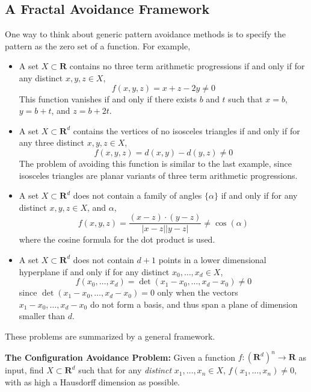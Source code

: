 \documentclass{article}
\theoremstyle{plain}
\theoremstyle{plain}
\begin{document}
\begin{multicols}{2}

\section{A Fractal Avoidance Framework}

One way to think about generic pattern avoidance methods is to specify the pattern as the zero set of a function. For example,
%
\begin{itemize}
	\item A set $X \subset \mathbf{R}$ contains no three term arithmetic progressions if and only if for any distinct $x,y,z \in X$,
	\[ f(x,y,z) = x + z - 2y \neq 0  \]
	This function vanishes if and only if there exists $b$ and $t$ such that $x = b$, $y = b+t$, and $z = b+2t$.

	\item A set $X \subset \mathbf{R}^d$ contains the vertices of no isosceles triangles if and only if for any three distinct $x,y,z \in X$,
	\[ f(x,y,z) = d(x,y) - d(y,z) \neq 0 \]
	The problem of avoiding this function is similar to the last example, since isosceles triangles are planar variants of three term arithmetic progressions.

	\item A set $X \subset \mathbf{R}^d$ does not contain a family of angles $\{ \alpha \}$ if and only if for any distinct $x,y,z \in X$, and $\alpha$,
	\[ f(x,y,z) = \frac{(x - z) \cdot (y - z)}{|x - z||y - z|} \neq \cos(\alpha) \]
	where the cosine formula for the dot product is used.

	\item A set $X \subset \mathbf{R}^d$ does not contain $d+1$ points in a lower dimensional hyperplane if and only if for any distinct $x_0, \dots, x_d \in X$,
	\[ f(x_0, \dots, x_d) = \det(x_1 - x_0, \dots, x_d - x_0) \neq 0 \]
	since $\det(x_1 - x_0, \dots, x_d - x_0) = 0$ only when the vectors $x_1 - x_0, \dots, x_d - x_0$ do not form a basis, and thus span a plane of dimension smaller than $d$.
\end{itemize}
%
These problems are summarized by a general framework.

\begin{changemargin}{0.5em}{0em}
{\bf The Configuration Avoidance Problem:} Given a function $f: (\mathbf{R}^d)^n \to \mathbf{R}$ as input, find $X \subset \mathbf{R}^d$ such that for any {\it distinct} $x_1, \dots, x_n \in X$, $f(x_1, \dots, x_n) \neq 0$, with as high a Hausdorff dimension as possible.
\end{changemargin}


\end{multicols}
\end{document}
